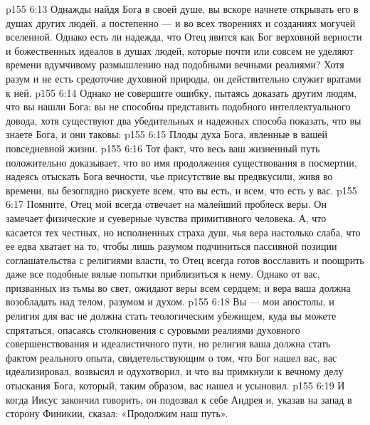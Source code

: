 \vs p155 6:13 Однажды найдя Бога в своей душе, вы вскоре начнете открывать его в душах других людей, а постепенно --- и во всех творениях и созданиях могучей вселенной. Однако есть ли надежда, что Отец явится как Бог верховной верности и божественных идеалов в душах людей, которые почти или совсем не уделяют времени вдумчивому размышлению над подобными вечными реалиями? Хотя разум и не есть средоточие духовной природы, он действительно служит вратами к ней.
\vs p155 6:14 Однако не совершите ошибку, пытаясь доказать другим людям, что вы нашли Бога; вы не способны представить подобного интеллектуального довода, хотя существуют два убедительных и надежных способа показать, что вы знаете Бога, и они таковы:
\vs p155 6:15 \bibnobreakspace Плоды духа Бога, явленные в вашей повседневной жизни.
\vs p155 6:16 \bibnobreakspace Тот факт, что весь ваш жизненный путь положительно доказывает, что во имя продолжения существования в посмертии, надеясь отыскать Бога вечности, чье присутствие вы предвкусили, живя во времени, вы безоглядно рискуете всем, что вы есть, и всем, что есть у вас.
\vs p155 6:17 \pc Помните, Отец мой всегда отвечает на малейший проблеск веры. Он замечает физические и суеверные чувства примитивного человека. А, что касается тех честных, но исполненных страха душ, чья вера настолько слаба, что ее едва хватает на то, чтобы лишь разумом подчиниться пассивной позиции соглашательства с религиями власти, то Отец всегда готов восславить и поощрить даже все подобные вялые попытки приблизиться к нему. Однако от вас, призванных из тьмы во свет, ожидают веры всем сердцем; и вера ваша должна возобладать над телом, разумом и духом.
\vs p155 6:18 Вы --- мои апостолы, и религия для вас не должна стать теологическим убежищем, куда вы можете спрятаться, опасаясь столкновения с суровыми реалиями духовного совершенствования и идеалистичного пути, но религия ваша должна стать фактом реального опыта, свидетельствующим о том, что Бог нашел вас, вас идеализировал, возвысил и одухотворил, и что вы примкнули к вечному делу отыскания Бога, который, таким образом, вас нашел и усыновил.
\vs p155 6:19 \pc И когда Иисус закончил говорить, он подозвал к себе Андрея и, указав на запад в сторону Финикии, сказал: «Продолжим наш путь».
